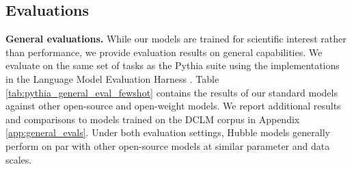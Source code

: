 % 

\subsection{Evaluations} \label{sec:evaluations}


\textbf{General evaluations.} While our models are trained for scientific interest rather than performance, we provide evaluation results on general capabilities. We evaluate on the same set of tasks as the Pythia suite using the implementations in the Language Model Evaluation Harness \cite[lm-eval-harness;][]{eval-harness}. Table \ref{tab:pythia_general_eval_fewshot} contains the results of our standard models against other open-source and open-weight models. We report additional results and comparisons to models trained on the \textsc{DCLM} corpus in Appendix \ref{app:general_evals}. Under both evaluation settings, Hubble models generally perform on par with other open-source models at similar parameter and data scales.


